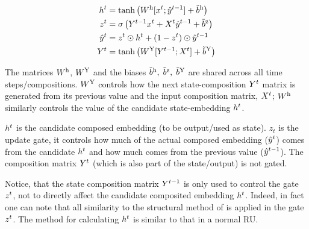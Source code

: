 \documentclass[12pt,parskip]{komatufte}
\begin{document}
\begin{align}
\n h_t &= \tanh\left(\d W_h [\n x_t; \n \hat{y}_{t-1}] + \dv b_h \right)\\
\n z_t &= \sigma\left(\n Y_{t-1} \n x_t + \n X_t \n \hat{y}_{t-1} + \dv b_z \right)\\
%
\n \hat{y}_t &= \n z_t \odot \n h_t + (1 - \n z_t) \odot \n \hat{y}_{t-1} \\
\n Y_t &= \tanh \left( \d W_Y [\n Y_{t-1}; \n X_t] + \dv b_Y \right)
\end{align}



The matrices $\d W_h$, $\d W_Y$ and the biases $\dv b_h,\; \dv b_z,\; \dv b_Y$ are shared across all time steps/compositions.
$\d W_Y$ controls how the next state-composition $\n Y_t$ matrix is generated from its previous value and the input composition matrix, $\n X_t$;
$\d W_h$ similarly controls the value of the candidate state-embedding $\n h_t$.

$\n h_t$ is the candidate composed embedding (to be output/used as state).
$z_t$ is the update gate, it controls how much of the actual composed embedding ($\n \hat{y}_t$) comes from the candidate $\n h_t$ and how much comes from the previous value ($\n \hat{y}_{t-1}$).
The composition matrix $\n Y_t$ (which is also part of the state/output) is not gated.

Notice, that the state composition matrix $\n Y_{t-1}$ is only used to control the gate $\n z_t$, not to directly affect the candidate composited embedding $\n h_t$.
Indeed, in fact one can note that all similarity to the structural method of \textcite{SocherMVRNN} is applied in the gate $\n z_t$.
The method for calculating $\n h_t$ is similar to that in a normal RU.
\end{document}
